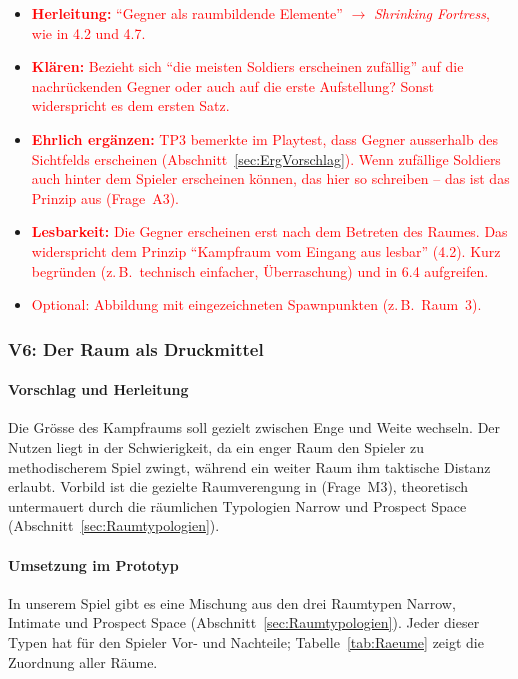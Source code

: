 \documentclass[../Main.tex]{subfiles}
\begin{document}
\begin{itemize}[leftmargin=1.5cm]
    \item \textcolor{red}{\textbf{Herleitung:} \enquote{Gegner als raumbildende Elemente} $\rightarrow$ \textit{Shrinking Fortress}, wie in 4.2 und 4.7.}
    \item \textcolor{red}{\textbf{Klären:} Bezieht sich \enquote{die meisten Soldiers erscheinen zufällig} auf die nachrückenden Gegner oder auch auf die erste Aufstellung? Sonst widerspricht es dem ersten Satz.}
    \item \textcolor{red}{\textbf{Ehrlich ergänzen:} TP3 bemerkte im Playtest, dass Gegner ausserhalb des Sichtfelds erscheinen (Abschnitt~\ref{sec:ErgVorschlag}). Wenn zufällige Soldiers auch hinter dem Spieler erscheinen können, das hier so schreiben -- das ist das Prinzip aus  (Frage~A3).}
    \item \textcolor{red}{\textbf{Lesbarkeit:} Die Gegner erscheinen erst nach dem Betreten des Raumes. Das widerspricht dem Prinzip \enquote{Kampfraum vom Eingang aus lesbar} (4.2). Kurz begründen (z.\,B.\ technisch einfacher, Überraschung) und in 6.4 aufgreifen.}
    \item \textcolor{red}{Optional: Abbildung mit eingezeichneten Spawnpunkten (z.\,B.\ Raum~3).}
\end{itemize}

\subsubsection{V6: Der Raum als Druckmittel} \label{sec:V6}

\paragraph{Vorschlag und Herleitung}
Die Grösse des Kampfraums soll gezielt zwischen Enge und Weite wechseln. Der Nutzen liegt in der Schwierigkeit, da ein enger Raum den Spieler zu methodischerem Spiel zwingt, während ein weiter Raum ihm taktische Distanz erlaubt. Vorbild ist die gezielte Raumverengung in  (Frage~M3), theoretisch untermauert durch die räumlichen Typologien Narrow und Prospect Space (Abschnitt~\ref{sec:Raumtypologien}).

\paragraph{Umsetzung im Prototyp}
In unserem Spiel gibt es eine Mischung aus den drei Raumtypen Narrow, Intimate und Prospect Space (Abschnitt~\ref{sec:Raumtypologien}). Jeder dieser Typen hat für den Spieler Vor- und Nachteile; Tabelle~\ref{tab:Raeume} zeigt die Zuordnung aller Räume.
\end{document}
